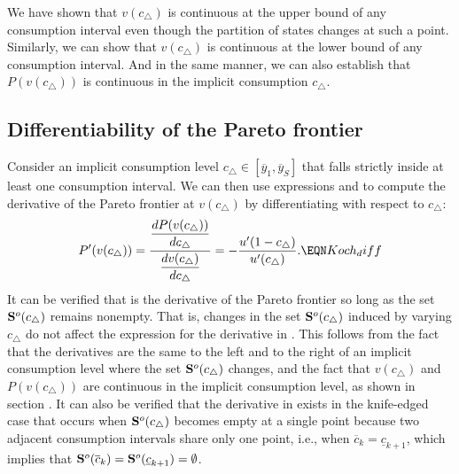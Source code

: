 We have shown that $v(c_{\triangle})$ is continuous at the upper
bound of any consumption interval even though the partition of states
changes at such a point. Similarly, we can show that $v(c_{\triangle})$ is
continuous at the lower bound of any consumption interval. And in
the same manner, we can also establish that
$P\!\left(v(c_{\triangle})\right)$ is continuous in the implicit
consumption $c_{\triangle}$.




\subsection{Differentiability of the Pareto frontier}\label{sec:Koch_nondiff}%
Consider an implicit consumption level $c_{\triangle} \in
[\overline y_1, \overline y_S]$ that falls strictly inside at
least one consumption interval. We can then use expressions
 and  to compute the derivative of
the Pareto frontier at $v(c_{\triangle})$ by differentiating with
respect to $c_{\triangle}$:
$$ P'\!\left(v(c_{\triangle})\right) =
{ \displaystyle {\displaystyle d P\!\left(v(c_{\triangle})\right)
\over
   \displaystyle d c_{\triangle}  }           \over
  \displaystyle {\displaystyle d v(c_{\triangle}) \over
   \displaystyle d c_{\triangle} }   }
=  -{u'(1 -c_{\triangle})
   \over u'(c_{\triangle}) }.                      \EQN Koch_diff
$$
It can be verified that  is the derivative of the
Pareto frontier so long as the set ${\bf S}^o(c_{\triangle})$
remains nonempty. That is, changes in the set
${\bf S}^o(c_{\triangle})$ induced by varying $c_{\triangle}$
do not affect the expression for the
derivative in . This follows from the fact that
the derivatives are the same to the left and to the right of an
implicit consumption level where the set ${\bf S}^o(c_{\triangle})$
changes, and the fact that $v(c_{\triangle})$ and
$P\!\left(v(c_{\triangle})\right)$ are continuous in
the implicit consumption level, as shown in section
.
It can also be verified that the derivative in
 exists in the knife-edged case that occurs when
${\bf S}^o(c_{\triangle})$ becomes empty at a single point because
two adjacent consumption intervals share only one point, i.e.,
when $\overline c_k = \underline c_{k+1}$, which implies that ${\bf
S}^o(\overline c_k) = {\bf S}^o(\underline c_{k+1}) =\emptyset$.

